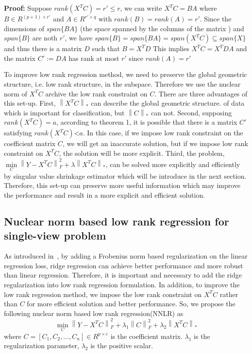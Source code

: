 \documentclass{ieeeaccess}
\begin{document}
\textbf{Proof:} Suppose $rank({X^T}C ) = {r'} \le r$, we can write ${X^T}C = BA$ where $B \in {R^{(p + 1) \times {r'}}}$ and $A \in {R^{{r'} \times q}}$ with $rank(B) = rank(A) = {r'}$. Since the dimensions of $span\{ BA\} $ (the space spanned by the columns of the matrix ) and $span\{ B\} $ are noth ${r'}$, we have $span\{ B\}  = span\{ BA\}  = span({X^T}C ) \subseteq span\{ {X}\}$ and thus there is a matrix $D$ such that $B = {X^T}D$
This implies ${X^T}C  = {X^T}DA$ and the matrix ${C'}:=DA$ has rank at most ${r'}$ since $rank(A) = {r'}$

To improve low rank regression method, we need to preserve the global geometric structure, i.e. low rank structure, in the subspace.
Therefore we use the nuclear norm of ${X^T}C $ archive the low rank constraint on $C$. There are three advantages of this set-up. First, ${\left\| {{X^T}C } \right\|_*}$ can describe the global geometric structure. of data which is important for classification, but ${\left\| C  \right\|_*}$ can not. Second, supposing $rank({X^T}C ) = a$, according to theorem 1, it is possible that there is a matrix ${C'}$ satisfying $rank({X^T}C ) $<$ a$. In this case, if we impose low rank constraint on the coefficient matrix $C$, we will get an inaccurate solution, but if we impose low rank constraint on ${X^T}C$, the solution will be more explicit. Third, the problem, $\mathop {\min }\limits_C  \left\| {Y - {X^T}C } \right\|_F^2 + \lambda {\left\| {{X^T}C } \right\|_*}$, can be solved more explicitly and efficiently by singular value shrinkage estimator which will be introduce in the next section. Therefore, this set-up can preserve more useful information which may improve the performance and result in a more explicit and efficient solution.

\subsection{Nuclear norm based low rank regression for single-view problem}

As introduced in~\cite{ref19,ref25}, by adding a Frobenius norm based regularization on the linear regression loss, ridge regression can achieve better performance and more robust than linear regression. Therefore, it is important and necessary to add the ridge regularization into low rank regression formulation. In addition, to improve the low rank regression method, we impose the low rank constraint on ${X^T}C $ rather than $C$ for more efficient solution and better performance. So, we propose the following nuclear norm based low rank regression(NNLR) as
\begin{equation}\label{eq04}
\mathop {\min }\limits_C  \left\| {Y - {X^T}C } \right\|_F^2 + {\lambda _1}\left\| C  \right\|_F^2 + {\lambda _2}{\left\| {{X^T}C } \right\|_*}
\end{equation}
where $C  = [{C _1},{C _2},...,{C _n}] \in {R^{p \times c}}$ is the coefficient matrix. ${\lambda _1}$ is the regularization parameter, ${\lambda _2}$ is the positive scalar.
\end{document}
